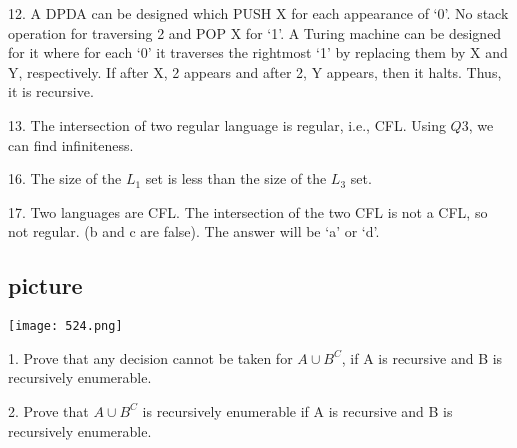 \documentclass[8pt]{beamer}
\begin{document}
\begin{frame}
12. A DPDA can be designed which PUSH X for each appearance of ‘0’. No stack operation for
traversing 2 and POP X for ‘1’. A Turing machine can be designed for it where for each ‘0’ it
traverses the rightmost ‘1’ by replacing them by X and Y, respectively. If after X, 2 appears and
after 2, Y appears, then it halts. Thus, it is recursive.\\
\vspace*{0.2cm}

13. The intersection of two regular language is regular, i.e., CFL. Using $Q3$, we can find infiniteness.\\
\vspace*{0.2cm}

16. The size of the $L _{1}$ set is less than the size of the $L _{3}$ set.\\
\vspace*{0.2cm}

17. Two languages are CFL. The intersection of the two CFL is not a CFL, so not regular. (b and c are
false). The answer will be ‘a’ or ‘d’.\\
\vspace*{0.1cm}

\begin{center}
\section{picture}
\texttt{[image: 524.png]}
\end{center}

1. Prove that any decision cannot be taken for $A \cup B ^{C}$, if A is recursive and B is recursively enumerable.\\
\vspace*{0.2cm}

2. Prove that $A \cup B ^{C}$ is recursively enumerable if A is recursive and B is recursively enumerable.\\
\end{frame}
\end{document}
